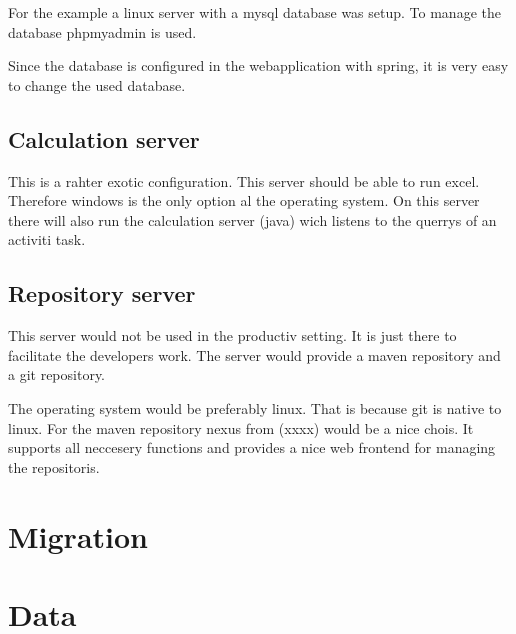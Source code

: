 \documentclass[paper=a4,twoside=false,BCOR=0mm,DIV=calc,fontsize=12pt]{scrartcl}
\begin{document}
For the example a linux server with a mysql database was setup.
To manage the database phpmyadmin is used.

Since the database is configured in the webapplication with spring, it is very easy to change the used database.


\subsection{Calculation server}
This is a rahter exotic configuration. This server should be able to run excel. Therefore windows is the only option al the operating system. On this server there will also run the calculation server (java) wich listens to the querrys of an activiti task.



\subsection{Repository server}
This server would not be used in the productiv setting. It is just there to facilitate the developers work.
The server would provide a maven repository and a git repository. 

The operating system would be preferably linux. That is because git is native to linux.
For the maven repository nexus from (xxxx) would be a nice chois. It supports all neccesery functions and provides a nice web frontend for managing the repositoris.







\section{Migration}


\section{Data}
\end{document}
